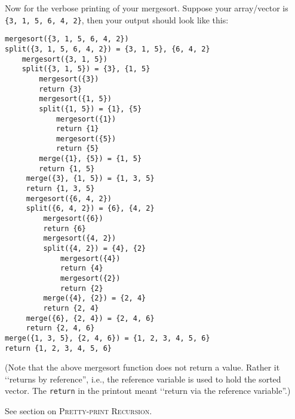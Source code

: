 Now for the verbose printing of your mergesort.
Suppose your array/vector is \\
\verb!{3, 1, 5, 6, 4, 2}!,
then your output should look like this:
\begin{Verbatim}[frame=single,commandchars=\~\!\@,fontsize=\footnotesize]
mergesort({3, 1, 5, 6, 4, 2})
split({3, 1, 5, 6, 4, 2}) = {3, 1, 5}, {6, 4, 2}
    mergesort({3, 1, 5})
    split({3, 1, 5}) = {3}, {1, 5}
        mergesort({3})
        return {3}
        mergesort({1, 5})
        split({1, 5}) = {1}, {5}
            mergesort({1}) 
            return {1}
            mergesort({5})
            return {5}
        merge({1}, {5}) = {1, 5}
        return {1, 5}
     merge({3}, {1, 5}) = {1, 3, 5}
     return {1, 3, 5}
     mergesort({6, 4, 2})
     split({6, 4, 2}) = {6}, {4, 2}
         mergesort({6})
         return {6}
         mergesort({4, 2})
         split({4, 2}) = {4}, {2}
             mergesort({4})
             return {4}
             mergesort({2})
             return {2}
         merge({4}, {2}) = {2, 4}
         return {2, 4}
     merge({6}, {2, 4}) = {2, 4, 6}
     return {2, 4, 6}
merge({1, 3, 5}, {2, 4, 6}) = {1, 2, 3, 4, 5, 6}
return {1, 2, 3, 4, 5, 6}
\end{Verbatim} 

(Note that the above mergesort function does not
return a value. Rather it \lq\lq returns by reference'', i.e.,
the reference variable is used to hold the sorted vector.
The \texttt{return} in the printout meant
\lq\lq return via the reference
variable''.)

See section on \textsc{Pretty-print Recursion}.
